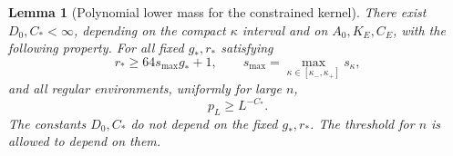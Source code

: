 \documentclass[11pt]{article}
\newtheorem{lemma}[theorem]{Lemma}
\theoremstyle{definition}\newtheorem{definition}[theorem]{Definition}
\theoremstyle{remark}\newtheorem{remark}[theorem]{Remark}
\numberwithin{equation}{section}\allowdisplaybreaks
\begin{document}
\begin{lemma}[Polynomial lower mass for the constrained kernel]
\label{lem:boxes}
There exist $D_0,C_*<\infty$, depending on the compact $\kappa$ interval
and on $A_0,K_E,C_E$, with the following property. For all fixed $g_*,r_*$
satisfying
\begin{equation}\label{eq:rg}
 r_*\ge64 s_{\max}g_*+1,\qquad
 s_{\max}=\max_{\kappa\in[\kappa_-,\kappa_+]}s_\kappa,
\end{equation}
and all regular environments, uniformly for large $n$,
\begin{equation}\label{eq:polynomial-cost}
 p_L\ge L^{-C_*}.
\end{equation}
The constants $D_0,C_*$ do not depend on the fixed $g_*,r_*$. The
threshold for $n$ is allowed to depend on them.
\end{lemma}
\end{document}
